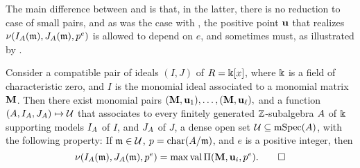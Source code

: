 \documentclass{amsart}
\begin{document}
The main difference between   and   is that, in the latter, there is no reduction to case of small pairs, and as was the case with  , the positive point $\mathbf{u}$ that realizes $\nu(I_A(\mathfrak{m}), J_A(\mathfrak{m}), p^e)$ is allowed to depend on $e$, and sometimes must, as illustrated by .

\begin{theorem}
   \label{nu invariants associated to a monomial ideal in large characteristic: T}   
   Consider a compatible pair of ideals $(I,J)$ of $R=\Bbbk[x]$, where $\Bbbk$ is a field of characteristic zero, and $I$ is the monomial ideal associated to a monomial matrix $\mathbf{M}$.  Then there exist monomial pairs $(\mathbf{M}, \mathbf{u}_1),  \ldots, (\mathbf{M}, \mathbf{u}_{\ell}),$ and a function $(A, I_A, J_A) \mapsto \mathcal{U}$  that associates to every finitely generated $\mathbb{Z}$-subalgebra $A$ of $\Bbbk$ supporting models $I_A$ of $I$, and $J_A$ of $J$, a dense open set $\mathcal{U} \subseteq \operatorname{mSpec}(A)$, with the following property\textup:
   If $\mathfrak{m} \in \mathcal{U}$, $p = \operatorname{char}(A/\mathfrak{m})$, and $e$ is a positive integer, then 
   \[
      \nu(I_A(\mathfrak{m}), J_A(\mathfrak{m}), p^e) = \max \operatorname{val} \Pi (\mathbf{M}, \mathbf{u}_i, p^e).
      \qed
   \]
\end{theorem}

\newpage

{\small


}
\end{document}

